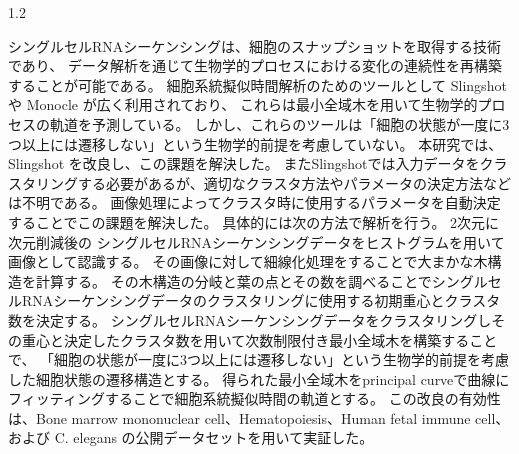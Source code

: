 \documentclass[dvipdfmx,11pt]{kuisthesis}
\date{2025年2月6日}				%
\begin{document}
\maketitle					%
\begin{spacing}{1.2} %

\begin{jabstract}				%
  シングルセルRNAシーケンシングは、細胞のスナップショットを取得する技術であり、
  データ解析を通じて生物学的プロセスにおける変化の連続性を再構築することが可能である。
  細胞系統擬似時間解析のためのツールとして Slingshot や Monocle が広く利用されており、
  これらは最小全域木を用いて生物学的プロセスの軌道を予測している。
  しかし、これらのツールは「細胞の状態が一度に3つ以上には遷移しない」という生物学的前提を考慮していない。
  本研究では、Slingshot を改良し、この課題を解決した。
  またSlingshotでは入力データをクラスタリングする必要があるが、適切なクラスタ方法やパラメータの決定方法などは不明である。
  画像処理によってクラスタ時に使用するパラメータを自動決定することでこの課題を解決した。
  具体的には次の方法で解析を行う。
  2次元に次元削減後の シングルセルRNAシーケンシングデータをヒストグラムを用いて画像として認識する。
  その画像に対して細線化処理をすることで大まかな木構造を計算する。
  その木構造の分岐と葉の点とその数を調べることでシングルセルRNAシーケンシングデータのクラスタリングに使用する初期重心とクラスタ数を決定する。
  シングルセルRNAシーケンシングデータをクラスタリングしその重心と決定したクラスタ数を用いて次数制限付き最小全域木を構築することで、
  「細胞の状態が一度に3つ以上には遷移しない」という生物学的前提を考慮した細胞状態の遷移構造とする。
  得られた最小全域木をprincipal curveで曲線にフィッティングすることで細胞系統擬似時間の軌道とする。
  この改良の有効性は、Bone marrow mononuclear cell、Hematopoiesis、Human fetal immune cell、および C. elegans の公開データセットを用いて実証した。

  
  
\end{jabstract}


\end{spacing}
\end{document}
